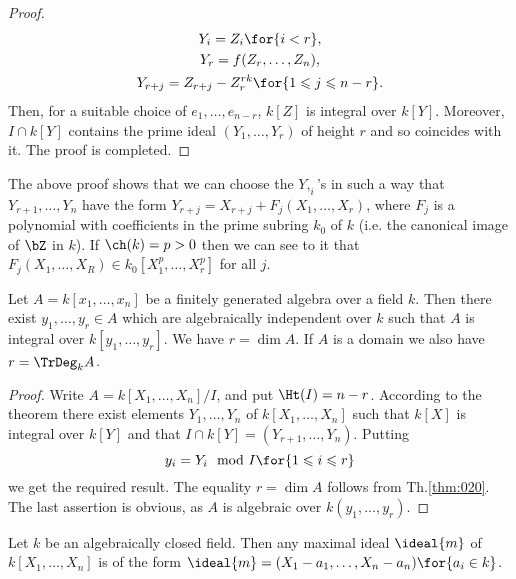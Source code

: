 \documentclass[../main]{subfiles}
\begin{document}
\begin{proof}
\begin{gather*}
Y_i= Z_i\for{i<r},\\
Y_r=f(Z_r,\ldots,Z_n),\\
Y_{r+j}=Z_{r+j}-Z_r^{rk}\for{1\leqslant j\leqslant n-r}.
\end{gather*}
Then, for a suitable choice of $e_1,\ldots,e_{n-r}$, $k[Z]$ is integral over $k[Y]$. Moreover, $I\cap k[Y]$ contains the prime ideal $(Y_1,\ldots,Y_r)$ of height $r$ and so coincides with it. The proof is completed.
\end{proof}

\begin{remark}
The above proof shows that we can choose the $Y,_i$'s in such a way that $Y_{r+1},\ldots,Y_n$ have the form $Y_{r+j}=X_{r+j}+F_j(X_1,\ldots,X_r)$, where $F_j$ is a polynomial with coefficients in the prime subring $k_0$ of $k$ (i.e. the canonical image of $\bZ$ in $k$). If $\ch(k) = p > 0$ then we can see to it that\newline  $F_j(X_1,\ldots,X_R)\in k_0[X_1^p,\ldots,X_r^p]$ for all $j$.
\end{remark}

\begin{parcorollary}\label{cor:14.03}
Let \newline $A = k[x_1,\ldots,x_n]$ be a finitely generated algebra over a field $k$. Then there exist $y_1,\ldots,y_r\in A$ which are algebraically independent over $k$ such that $A$ is integral over $k[y_1,\ldots,y_r]$. We have $r = \dim A$. If $A$ is a domain we also have $r=\TrDeg_kA$.
\end{parcorollary}

\begin{proof}
Write $A = k[X_1,\ldots,X_n]/I$, and put $\Ht(I) =n- r$. According to the theorem there exist elements $Y_1,\ldots,Y_n$ of $k[X_1,\ldots,X_n]$ such that $k[X]$ is integral over $k[Y]$ and that $I\cap k[Y] = (Y_{r+1},\ldots,Y_n)$. Putting \[y_i = Y_i \mod I\for{1\leqslant i\leqslant r}\] we get the required result. The equality $r = \dim A$ follows from Th.\ref{thm:020}. The last assertion is obvious, as $A$ is algebraic over $k(y_1,\ldots,y_r)$.
\end{proof}

\begin{corollary}\label{cor:14.04}
Let $k$ be an algebraically closed field. Then any maximal ideal $\ideal{m}$ of $k[X_1,\ldots,X_n]$ is of the form $\ideal{m} = (X_1-a_1,\ldots,X_n-a_n)\for{a_i\in k}$.
\end{corollary}
\end{document}
